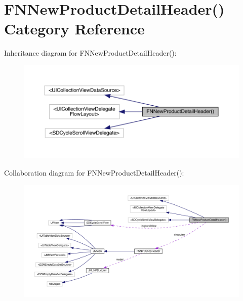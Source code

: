 \hypertarget{category_f_n_new_product_detail_header_07_08}{}\section{F\+N\+New\+Product\+Detail\+Header() Category Reference}
\label{category_f_n_new_product_detail_header_07_08}


Inheritance diagram for F\+N\+New\+Product\+Detail\+Header()\+:\nopagebreak
\begin{figure}[H]
\begin{center}
\leavevmode
\includegraphics[width=350pt]{category_f_n_new_product_detail_header_07_08__inherit__graph}
\end{center}
\end{figure}


Collaboration diagram for F\+N\+New\+Product\+Detail\+Header()\+:\nopagebreak
\begin{figure}[H]
\begin{center}
\leavevmode
\includegraphics[width=350pt]{category_f_n_new_product_detail_header_07_08__coll__graph}
\end{center}
\end{figure}
